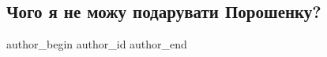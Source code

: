  
 
 
 
 
\subsection{Чого я не можу подарувати Порошенку?}
\label{sec:16_01_2022.stz.news.ua.hvylya.2.poroshenko_kamerton}

\ifcmt
 author_begin
   author_id 
 author_end
\fi
